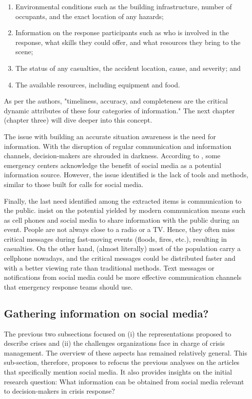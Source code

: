 \begin{enumerate}
    \item Environmental conditions such as the building infrastructure, number of occupants, and the exact location of any hazards;
    \item Information on the response participants such as who is involved in the response, what skills they could offer, and what resources they bring to the scene;
    \item The status of any casualties, the accident location, cause, and severity; and
    \item The available resources, including equipment and food.
\end{enumerate}

As per the authors, "timeliness, accuracy, and completeness are the critical dynamic attributes of these four categories of information."
The next chapter (chapter three) will dive deeper into this concept.

The issue with building an accurate situation awareness is the need for information.
With the disruption of regular communication and information channels, decision-makers are shrouded in darkness.
According to \textcite{tapiaTrustworthyTweetDeeper2013,cobbDesigningDelugeUnderstanding2014}, some emergency centers acknowledge the benefit of social media as a potential information source.
However, the issue identified is the lack of tools and methods, similar to those built for calls for social media.

Finally, the last need identified among the extracted items is communication to the public.
\textcite{aloudatRegulationUbiquitousMobile2011} insist on the potential yielded by modern communication means such as cell phones and social media to share information with the public during an event.
People are not always close to a radio or a TV.
Hence, they often miss critical messages during fast-moving events (floods, fires, etc.), resulting in casualties.
On the other hand, (almost literally) most of the population carry a cellphone nowadays, and the critical messages could be distributed faster and with a better viewing rate than traditional methods.
Text messages or notifications from social media could be more effective communication channels that emergency response teams should use.

\subsection{Gathering information on social media?}
The previous two subsections focused on (i) the representations proposed to describe crises and (ii) the challenges organizations face in charge of crisis management.
The overview of these aspects has remained relatively general.
This sub-section, therefore, proposes to refocus the previous analyses on the articles that specifically mention social media.
It also provides insights on the initial research question: What information can be obtained from social media relevant to decision-makers in crisis response?

